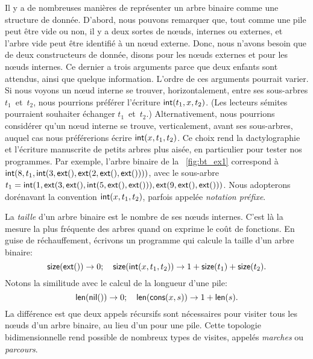 Il y a de nombreuses manières de représenter un arbre binaire comme
une structure de donnée. D'abord, nous pouvons remarquer que, tout
comme une pile peut être vide ou non, il y a deux sortes de nœuds,
internes ou externes, et l'arbre vide peut être identifié à un
nœud externe. Donc, nous n'avons besoin que de deux constructeurs
de donnée, disons  pour les
nœuds externes et  pour les
nœuds internes. Ce dernier a trois arguments parce que deux
enfants sont attendus, ainsi que quelque information. L'ordre de ces
arguments pourrait varier. Si nous voyons un nœud interne se
trouver, horizontalement, entre ses sous-arbres \(t_1\)~et~\(t_2\),
nous pourrions préférer l'écriture \(\textsf{int}(t_1,x,t_2)\). (Les
lecteurs sémites pourraient souhaiter échanger \(t_1\)~et~\(t_2\).)
Alternativement, nous pourrions considérer qu'un nœud interne se
trouve, verticalement, avant ses sous-arbres, auquel cas nous
préférerions écrire \(\textsf{int}(x,t_1,t_2)\). Ce choix rend la
dactylographie et l'écriture manuscrite de petits arbres plus aisée,
en particulier pour tester nos programmes. Par exemple,
l'arbre binaire de la \fig~\vref{fig:bt_ex1} correspond à
\(\textsf{int}(8, t_1, \textsf{int}(3, \textsf{ext}(), \textsf{ext}(2,
\textsf{ext}(), \textsf{ext}())))\), avec le sous-arbre \(t_1=\textsf{int}(1,
\textsf{ext}(3, \textsf{ext}(), \textsf{int}(5, \textsf{ext}(), \textsf{ext}())),
\textsf{ext}(9, \textsf{ext}(), \textsf{ext}()))\). Nous adopterons dorénavant
la convention \(\textsf{int}(x,t_1,t_2)\), parfois appelée \emph{notation
  préfixe}.

La \emph{taille} d'un arbre binaire est le
nombre de ses nœuds internes. C'est là la mesure la plus fréquente
des arbres quand on exprime le coût de fonctions. En guise de
réchauffement, écrivons un programme qui calcule la taille d'un arbre
binaire:
\begin{equation}
\fun{size}(\fun{ext}()) \rightarrow 0;\quad
\fun{size}(\fun{int}(x,t_1,t_2))
  \rightarrow 1 + \fun{size}(t_1) + \fun{size}(t_2).
\index{size@\fun{size/1}}
\label{eq:size}
\end{equation}
Notons la similitude avec le calcul de la longueur d'une pile:
\begin{equation*}
\fun{len}(\fun{nil}()) \rightarrow 0;\quad
\fun{len}(\fun{cons}(x,s)) \rightarrow 1 + \fun{len}(s).
\index{len@\fun{len/1}}
\index{nil@\fun{nil/0}}
\index{cons@\fun{cons/2}}
\end{equation*}
La différence est que deux appels récursifs sont nécessaires pour
visiter tous les nœuds d'un arbre binaire, au lieu d'un pour une
pile. Cette topologie bidimensionnelle rend possible de nombreux types
de visites, appelés \emph{marches} ou \emph{parcours}.

